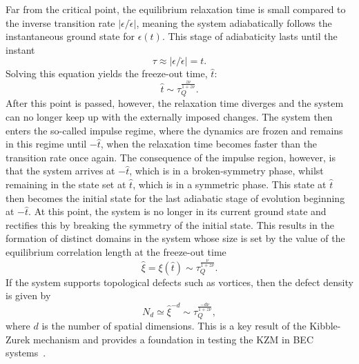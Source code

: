 Far from the critical point, the equilibrium relaxation time is small compared
to the inverse transition rate \( |\epsilon/\dot{\epsilon}| \), meaning the system
adiabatically follows the instantaneous ground state for \( \epsilon(t) \).
This stage of adiabaticity lasts until the instant
\begin{equation}
    \tau \approx |\epsilon/\dot{\epsilon}|=t.
    \label{eq: freeze-out-equal}
\end{equation}
Solving this equation yields the freeze-out time, \( \hat{t} \):
\begin{equation}
    \hat{t} \sim \tau_Q^\frac{z\nu}{1 + z\nu}.
    \label{eq: freeze-out-scaling}
\end{equation}
After this point is passed, however, the relaxation time diverges and the system
can no longer keep up with the externally imposed changes.
The system then enters the so-called impulse regime, where the dynamics are
frozen and remains in this regime until \( -\hat{t} \), when the relaxation
time becomes faster than the transition rate once again.
The consequence of the impulse region, however, is that the system arrives at
\( -\hat{t} \), which is in a broken-symmetry phase, whilst remaining
in the state set at \( \hat{t} \), which is in a symmetric phase.
This state at \( \hat{t} \) then becomes the initial state for the last adiabatic
stage of evolution beginning at \( -\hat{t} \).
At this point, the system is no longer in its current ground state and rectifies
this by breaking the symmetry of the initial state.
This results in the formation of distinct domains in the system whose size is
set by the value of the equilibrium correlation length at the freeze-out time
\begin{equation}
    \hat{\xi}=\xi(\hat{t}) \sim \tau_Q^{\frac{\nu}{1 + z\nu}}.
    \label{eq: KZM-domain-size}
\end{equation}
If the system supports topological defects such as vortices, then the defect
density is given by
\begin{equation}\label{eq: KZM-defects-scaling}
    N_d \simeq \hat{\xi}^{-d} \sim \tau_Q^{\frac{-d\nu}{1+z\nu}},
\end{equation}
where \( d \) is the number of spatial dimensions.
This is a key result of the Kibble-Zurek mechanism and provides a
foundation in testing the KZM in BEC systems~\cite{Damski2007, Swislocki2013,
    Anquez2016, Saito2007, Saito2007a}.

